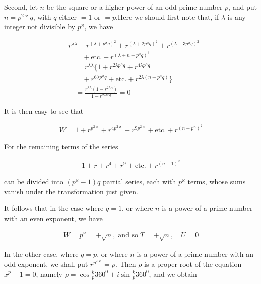
Second, let $n$ be the square or a higher power of an odd prime number $p$, and put $n=p^{2\varkappa}q$, with $q$ either $=1$ or $=p$.\quad Here we should first note that, if $\lambda$ is any integer not divisible by $p^\varkappa$, we have


\[
\begin{aligned}
&r^{\lambda\lambda}+r^{(\lambda+p^\varkappa q)^2}+r^{(\lambda+2p^\varkappa q)^2}+r^{(\lambda+3p^\varkappa q)^2}\\&\qquad+\text{etc.}+r^{(\lambda+n-p^\varkappa q)^{3}}\\
&\quad=r^{\lambda\lambda}\{1+r^{2\lambda p^\varkappa q}+r^{4\lambda p^\varkappa q}\\&\qquad+r^{6\lambda p^\varkappa q}+\text{etc.}+r^{2\lambda(n-p^\varkappa q)}\}\\&\quad=\frac{r^{\lambda\lambda}(1-r^{2\lambda n})}{1-r^{2\lambda p^\varkappa q}}=0
\end{aligned}
\]

It is then easy to see that

\[
\begin{aligned}
W=1+r^{p^{2\varkappa}}+r^{4p^{2\varkappa}}+r^{9p^{2\varkappa}}+\text{etc.}+r^{(n-p^\varkappa)^2}
\end{aligned}
\]

For the remaining terms of the series

\[
\begin{aligned}
1+r+r^4+r^9+\text{etc.}+r^{(n-1)^2}
\end{aligned}
\]

can be divided into $(p^\varkappa-1)q$ partial series, each with $p^\varkappa$ terms, whose sums vanish under the transformation just given.

It follows that in the case where $q=1$, or where $n$ is a power of a prime number with an even exponent, we have

\[
\begin{aligned}
W=p^\varkappa=+\surd n,\;\text{and so}\;T=+\surd n,\quad U=0
\end{aligned}
\]

In the other case, where $q=p$, or where $n$ is a power of a prime number with an odd exponent, we shall put $r^{p^{2\varkappa}}=\rho$. Then $\rho$ is a proper root of the equation $x^p-1=0$, namely $\rho=\cos\frac{k}{p}360^0+i\sin\frac{k}{p}360^0$, and we obtain

